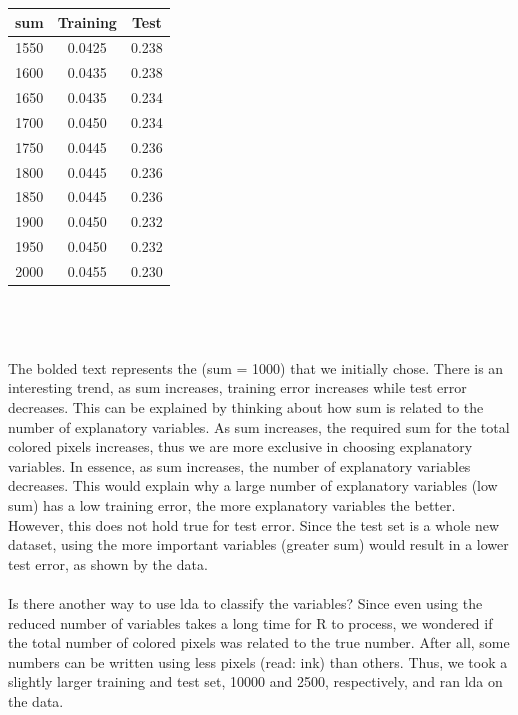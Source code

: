 \documentclass[10pt]{extarticle}
\begin{document}
\begin{minipage}{.25\textwidth}
	\begin{tabular}{c c c}
		sum & Training & Test\\ \hline
		1550&0.0425&0.238\\
		1600&0.0435&0.238\\
		1650&0.0435&0.234\\
		1700&0.0450&0.234\\
		1750&0.0445&0.236\\
		1800&0.0445&0.236\\
		1850&0.0445&0.236\\
		1900&0.0450&0.232\\
		1950&0.0450&0.232\\
		2000&0.0455&0.230
	\end{tabular}
\end{minipage}\\\\\\
The bolded text represents the (sum = 1000) that we initially chose. There is an interesting trend, as sum increases, training error increases while test error decreases. This can be explained by thinking about how sum is related to the number of explanatory variables. As sum increases, the required sum for the total colored pixels increases, thus we are more exclusive in choosing explanatory variables. In essence, as sum increases, the number of explanatory variables decreases. This would explain why a large number of explanatory variables (low sum) has a low training error, the more explanatory variables the better. However, this does not hold true for test error. Since the test set is a whole new dataset, using the more important variables (greater sum) would result in a lower test error, as shown by the data.\\\\
Is there another way to use lda to classify the variables? Since even using the reduced number of variables takes a long time for R to process, we wondered if the total number of colored pixels was related to the true number. After all, some numbers can be written using less pixels (read: ink) than others. Thus, we took a slightly larger training and test set, 10000 and 2500, respectively, and ran lda on the data.\\\\
\end{document}
